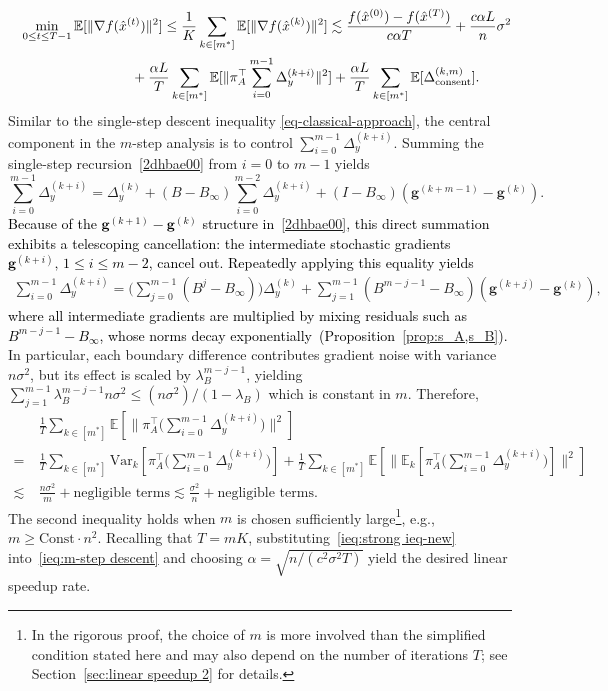 \documentclass[10pt]{article}
\newcommand{\vg}{{\mathbf{g}}}
\newcommand{\EE}{\mathbb{E}}
\newcommand{\norm}[1]{\| #1 \|}
\newcommand{\revision}[1]{\textcolor{black}{#1}}
\begin{document}
\begin{align}\label{ieq:m-step corrolary}
    \quad \min_{0\le t\le T-1} \EE[\norm{\nabla f(\hat{x}^{(t)})}^2] &\le \frac{1}{K}\sum_{k\in[m^*]}\EE[\norm{\nabla f(\hat{x}^{(k)})}^2] \lesssim \frac{f(\hat{x}^{(0)})-f(\hat{x}^{(T)})}{c\alpha T} + \frac{c\alpha L}{n}\sigma^2\nonumber\\
    &\hspace{-0.8cm} +  \frac{\alpha L}{T}\sum_{k\in[m^*]}\EE[\norm{\pi_A^\top \sum_{i=0}^{m-1}\Delta_y^{(k+i)}}^2] + \frac{\alpha L}{T}\sum_{k\in[m^*]}\EE[\Delta_{\text{consent}}^{(k,m)}].
\end{align}
Similar to the single-step descent inequality \eqref{eq-classical-approach}, the central component in the $m$-step analysis is to control $\sum_{i=0}^{m-1}\Delta_y^{(k+i)}$. Summing the single-step recursion~\eqref{2dhbae00} from $i=0$ to $m-1$ yields
\[\sum_{i=0}^{m-1}\Delta_y^{(k+i)} =\Delta_y^{(k)}  +(B-B_\infty)\sum_{i=0}^{m-2}\Delta_y^{(k+i)} +(I-B_\infty) (\vg^{(k+m-1)}-\vg^{(k)}).\]
\revision{Because of the $\vg^{(k+1)}-\vg^{(k)}$ structure in~\eqref{2dhbae00}, this direct summation exhibits a telescoping cancellation: the intermediate stochastic gradients $\vg^{(k+i)},\, 1\le i\le m-2$, cancel out. Repeatedly applying this equality yields} 
\begin{align}\label{eq:sum of deltay}
    \sum_{i=0}^{m-1}\Delta_y^{(k+i)} 
    = \Big(\sum_{j=0}^{m-1}(B^j-B_\infty)\Big)\Delta_y^{(k)} 
    + \sum_{j=1}^{m-1}(B^{m-j-1}-B_\infty)(\vg^{(k+j)}-\vg^{(k)}),
\end{align}
\revision{where all intermediate gradients are multiplied by mixing residuals such as \(B^{m-j-1}-B_\infty\), whose norms decay exponentially~(Proposition~\ref{prop:s_A,s_B}).} 
In particular, each boundary difference contributes gradient noise with variance $n\sigma^2$, but its effect is scaled by $\lambda_B^{m-j-1}$, yielding $\sum_{j=1}^{m-1}\lambda_B^{m-j-1}n\sigma^2 \le (n\sigma^2)/(1-\lambda_B)$ which is constant in $m$. Therefore,
\begin{align}
    &\ \frac{1}{T}\sum_{k\in[m^*]}\EE[\norm{\pi_A^\top \Big(\sum_{i=0}^{m-1}\Delta_y^{(k+i)}\Big)}^2]\label{ieq:strong ieq-new}\\
    =&\ \frac{1}{T}\sum_{k\in[m^*]}\mathrm{Var}_k[\pi_A^\top \Big(\sum_{i=0}^{m-1}\Delta_y^{(k+i)}\Big)] + \frac{1}{T}\sum_{k\in[m^*]}\EE[\norm{\EE_k[\pi_A^\top \Big(\sum_{i=0}^{m-1}\Delta_y^{(k+i)}\Big)]}^2]   \nonumber \\
    \lesssim &\ \frac{n\sigma^2}{m} + \text{negligible terms}  \lesssim \frac{\sigma^2}{n} + \text{negligible terms}.  \nonumber
\end{align}
The second inequality holds when $m$ is chosen sufficiently large\footnote{In the rigorous proof, the choice of $m$ is more involved than the simplified condition stated here and may also depend on the number of iterations $T$; see Section~\ref{sec:linear speedup 2} for details.}, e.g., $m \ge \text{Const}\cdot n^2$. Recalling that $T = mK$, substituting~\eqref{ieq:strong ieq-new} into~\eqref{ieq:m-step descent} and choosing $\alpha = \sqrt{n/(c^2\sigma^2 T)}$ yield the desired linear speedup rate. 
\end{document}
